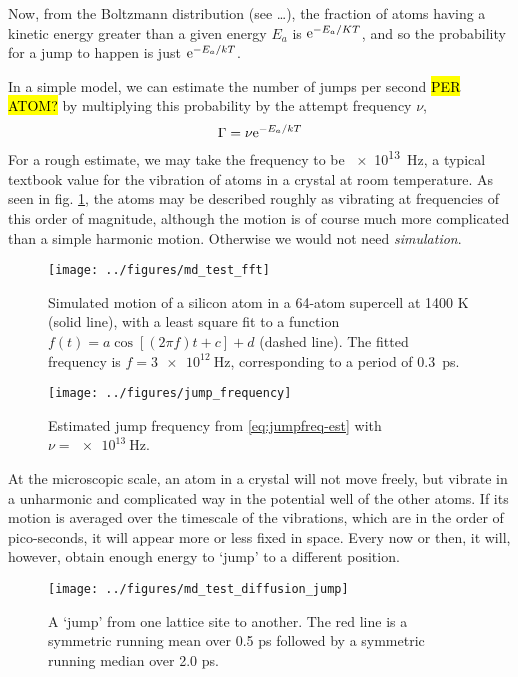 \documentclass[11pt,bibliography=totoc,index=totoc]{scrbook}   %
\newcommand{\comment}[1]{\hl{#1}}
\begin{document}
Now, from the Boltzmann distribution (see \ldots), the fraction of atoms having a kinetic energy greater than a given energy $E_a$ is $\mathrm{e}^{-E_a/KT}$, and so the probability for a jump to happen is just $\mathrm{e}^{-E_a/kT}$. 

In a simple model, we can estimate the number of jumps per second \comment{PER ATOM?} by multiplying this probability by the attempt frequency $\nu$,
\begin{equation}
  \Gamma = \nu \mathrm{e}^{-E_a/kT}
  \label{eq:jumpfreq-est}
\end{equation}
For a rough estimate, we may take the frequency to be \SI{e13}{\hertz}, a typical textbook value for the vibration of atoms in a crystal at room temperature.
As seen in fig. \ref{fig:simple-vibration}, the atoms may be described roughly as vibrating at frequencies of this order of magnitude, although the motion is of course much more complicated than a simple harmonic motion. Otherwise we would not need \emph{simulation}.

\begin{figure}[htbp]
  \begin{center}
    \texttt{[image: ../figures/md\_test\_fft]}
  \end{center}
  \caption{
    Simulated motion of a silicon atom in a 64-atom supercell at 1400 K (solid line), 
    with a least square fit to a function $f(t) = a \cos[(2\pi f)t + c] + d$ (dashed line). 
    The fitted frequency is $f=\SI{3e12}{\hertz}$, corresponding to a period of 0.3~ps.
  }
  \label{fig:simple-vibration}
\end{figure}

\begin{figure}[htbp]
  \begin{center}
    \texttt{[image: ../figures/jump\_frequency]}
  \end{center}
  \caption{Estimated jump frequency from \eqref{eq:jumpfreq-est} with $\nu=\SI{e13}{\hertz}$.}
  \label{fig:jumpfreq-est}
\end{figure}




At the microscopic scale, an atom in a crystal will not move freely, but vibrate in a unharmonic and complicated way in the potential well of the other atoms. 
If its motion is averaged over the timescale of the vibrations, which are in the order of pico-seconds, it will appear more or less fixed in space. 
Every now or then, it will, however, obtain enough energy to `jump' to a different position.

\begin{figure}[htbp]
  \begin{center}
    \texttt{[image: ../figures/md\_test\_diffusion\_jump]}
  \end{center}
  \caption{A `jump' from one lattice site to another. The red line is a symmetric running mean over 0.5 ps followed by a symmetric running median over 2.0 ps.}
  \label{fig:../figures/md_test_diffusion_jump}
\end{figure}
\end{document}
